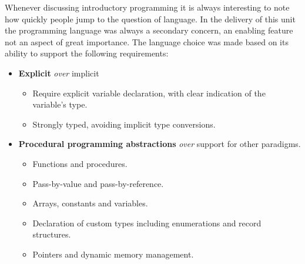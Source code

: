 Whenever discussing introductory programming it is always interesting to note how quickly people jump to the question of language. In the delivery of this unit the programming language was always a secondary concern, an enabling feature not an aspect of great importance. The language choice was made based on its ability to support the following requirements:
\begin{itemize}[noitemsep,nolistsep]
	\item \textbf{Explicit} \emph{over} implicit
	\begin{itemize}[noitemsep,nolistsep]
		\item Require explicit variable declaration, with clear indication of the variable's type.
		\item Strongly typed, avoiding implicit type conversions.
	\end{itemize}

	\item \textbf{Procedural programming abstractions} \emph{over} support for other paradigms.
	\begin{itemize}[noitemsep,nolistsep]
		\item Functions and procedures.
		\item Pass-by-value and pass-by-reference.
		\item Arrays, constants and variables.
		\item Declaration of custom types including enumerations and record structures.
		\item Pointers and dynamic memory management.
	\end{itemize}
\end{itemize}

